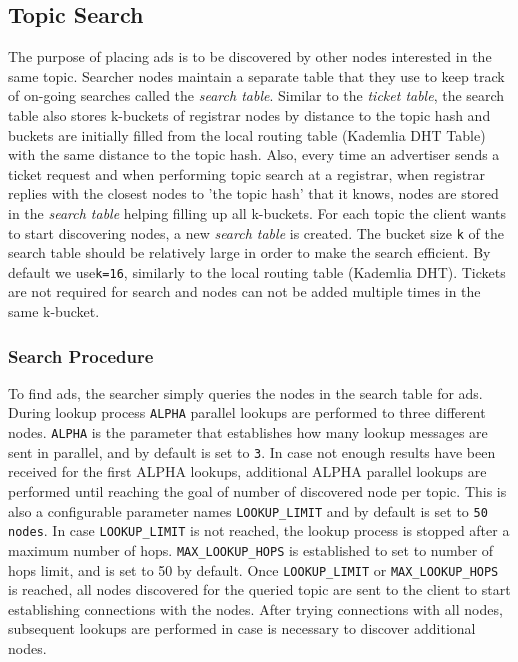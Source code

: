 \subsection{Topic Search}

The purpose of placing ads is to be discovered by other nodes interested in the same topic.  
Searcher nodes maintain a separate table that they use to keep track of on-going searches called the \emph{search table}. 
Similar to the \emph{ticket table}, the search table also stores k-buckets of registrar nodes by distance to the topic hash and buckets are initially filled from the local routing table (Kademlia DHT Table) with the same distance to the topic hash.
Also,  every time an advertiser sends a ticket request and when performing topic search at a registrar,  when registrar replies with the closest nodes to 'the topic hash' that it knows,  nodes are stored in the \emph{search table} helping filling up all k-buckets.
For each topic the client wants to start discovering nodes, a new \emph{search table} is created. 
The bucket size \texttt{k}  of the search table should be relatively large in order to make the search efficient. 
By default we use\texttt{k=16},  similarly to the local routing table (Kademlia DHT).
Tickets are not required for search and nodes can not be added multiple times in the same k-bucket.

\subsubsection{Search Procedure}

To find ads,  the searcher simply queries the nodes in the search table for ads. 
During lookup process \texttt{ALPHA} parallel lookups are performed to three different nodes. 
\texttt{ALPHA} is the parameter that establishes how many lookup messages are sent in parallel, and by default is set to \texttt{3}.
In case not enough results have been received for the first ALPHA lookups,  additional ALPHA parallel lookups are performed until
reaching the goal of number of discovered node per topic.
This is also a configurable parameter names \texttt{LOOKUP\_LIMIT} and by default is set to \texttt{50 nodes}. 
In case  \texttt{LOOKUP\_LIMIT}  is not reached, the lookup process is stopped after a maximum number of hops. 
\texttt{MAX\_LOOKUP\_HOPS} is established to set to number of hops limit, and is set to 50 by default.
Once  \texttt{LOOKUP\_LIMIT} or \texttt{MAX\_LOOKUP\_HOPS} is reached,  all nodes discovered for the queried topic are sent to the client to start establishing connections with the nodes.
After trying connections with all nodes,  subsequent lookups are performed in case is necessary to discover additional nodes.

